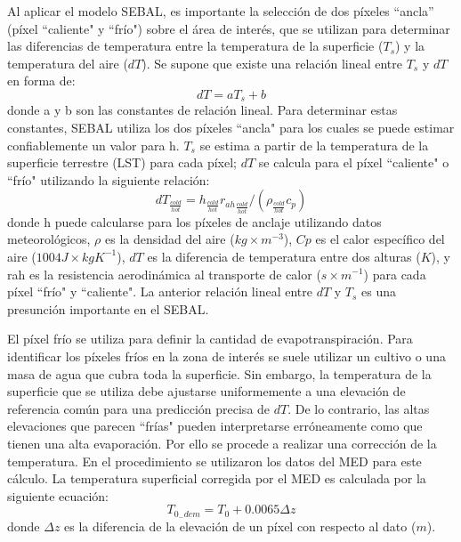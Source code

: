 Al aplicar el modelo SEBAL, es importante la selección de dos píxeles ``ancla'' (píxel ``caliente" y ``frío") sobre el área de interés, que se utilizan para determinar las diferencias de temperatura entre la temperatura de la superficie ($T_{s}$) y la temperatura del aire ($dT$). Se supone que existe una relación lineal entre $T_{s}$ y $dT$ en forma de:
\begin{equation}
    dT = aT_{s} + b
\end{equation}
donde a y b son las constantes de relación lineal. Para determinar estas constantes, SEBAL utiliza los dos píxeles ``ancla" para los cuales se puede estimar confiablemente un valor para h. $T_{s}$ se estima a partir de la temperatura de la superficie terrestre (LST)  para cada píxel; $dT$ se calcula para el píxel ``caliente" o ``frío" utilizando la siguiente relación:
\begin{equation}
    dT_{\frac{cold}{hot}} = h_{\frac{cold}{hot}}{r_{ah}}_{\frac{cold}{hot}}/\left ( \rho_{\frac{cold}{hot}}c_{p} \right )
\end{equation}
donde h puede calcularse para los píxeles de anclaje utilizando datos meteorológicos, $\rho$  es la densidad del aire ($kg\times m^{-3}$), $Cp$ es el calor específico del aire ($1004 J\times kgK^{-1}$), $dT$ es la diferencia de temperatura entre dos alturas ($K$), y rah es la resistencia aerodinámica al transporte de calor ($s\times m^{-1}$) para cada píxel ``frío" y ``caliente". La anterior relación lineal entre $dT$ y $T_{s}$ es una presunción importante en el SEBAL.

El píxel frío se utiliza para definir la cantidad de evapotranspiración. Para identificar los píxeles fríos en la zona de interés se suele utilizar un cultivo o una masa de agua que cubra toda la superficie. Sin embargo, la temperatura de la superficie que se utiliza debe ajustarse uniformemente a una elevación de referencia común para una predicción precisa de $dT$. De lo contrario, las altas elevaciones que parecen ``frías" pueden interpretarse erróneamente como que tienen una alta evaporación. Por ello se procede a realizar una corrección de la temperatura. En el procedimiento se utilizaron los datos del MED para este cálculo. La temperatura superficial corregida por el MED es calculada por la siguiente ecuación:
\begin{equation}
    T_{0_{-}dem} = T_{0} + 0.0065\Delta z
\end{equation}
donde $\Delta z $ es la diferencia de la elevación de un píxel con respecto al dato ($m$).

